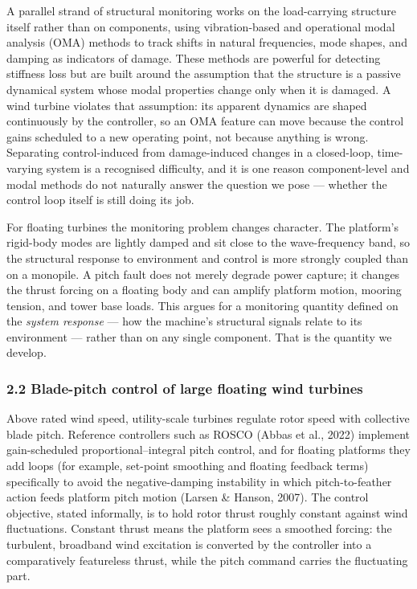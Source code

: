 \documentclass[
  english,
  11pt,
]{article}
\begin{document}
A parallel strand of structural monitoring works on the load-carrying
structure itself rather than on components, using vibration-based and
operational modal analysis (OMA) methods to track shifts in natural
frequencies, mode shapes, and damping as indicators of damage. These
methods are powerful for detecting stiffness loss but are built around
the assumption that the structure is a passive dynamical system whose
modal properties change only when it is damaged. A wind turbine violates
that assumption: its apparent dynamics are shaped continuously by the
controller, so an OMA feature can move because the control gains
scheduled to a new operating point, not because anything is wrong.
Separating control-induced from damage-induced changes in a closed-loop,
time-varying system is a recognised difficulty, and it is one reason
component-level and modal methods do not naturally answer the question
we pose --- whether the control loop itself is still doing its job.

For floating turbines the monitoring problem changes character. The
platform's rigid-body modes are lightly damped and sit close to the
wave-frequency band, so the structural response to environment and
control is more strongly coupled than on a monopile. A pitch fault does
not merely degrade power capture; it changes the thrust forcing on a
floating body and can amplify platform motion, mooring tension, and
tower base loads. This argues for a monitoring quantity defined on the
\emph{system response} --- how the machine's structural signals relate
to its environment --- rather than on any single component. That is the
quantity we develop.

\subsubsection{2.2 Blade-pitch control of large floating wind
turbines}\label{blade-pitch-control-of-large-floating-wind-turbines}

Above rated wind speed, utility-scale turbines regulate rotor speed with
collective blade pitch. Reference controllers such as ROSCO (Abbas et
al., 2022) implement gain-scheduled proportional--integral pitch
control, and for floating platforms they add loops (for example,
set-point smoothing and floating feedback terms) specifically to avoid
the negative-damping instability in which pitch-to-feather action feeds
platform pitch motion (Larsen \& Hanson, 2007). The control objective,
stated informally, is to hold rotor thrust roughly constant against wind
fluctuations. Constant thrust means the platform sees a smoothed
forcing: the turbulent, broadband wind excitation is converted by the
controller into a comparatively featureless thrust, while the pitch
command carries the fluctuating part.
\end{document}
